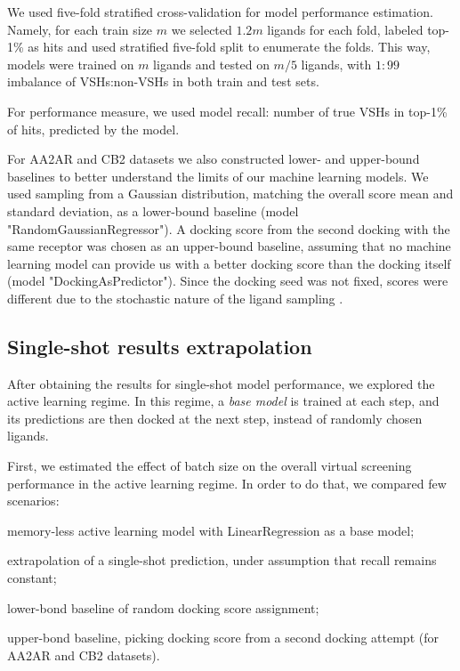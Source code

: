 We used five-fold stratified cross-validation for model performance estimation. Namely, for each train size $m$ we selected $1.2m$ ligands for each fold, labeled top-1\% as hits and used stratified five-fold split to enumerate the folds. This way, models were trained on $m$ ligands and tested on $m/5$ ligands, with $1:99$ imbalance of VSHs:non-VSHs in both train and test sets.

For performance measure, we used model recall: number of true VSHs in top-1\% of hits, predicted by the model.

For AA2AR and CB2 datasets we also constructed lower- and upper-bound baselines to better understand the limits of our machine learning models. We used sampling from a Gaussian distribution, matching the overall score mean and standard deviation, as a lower-bound baseline (model "RandomGaussianRegressor"). A docking score from the second docking with the same receptor was chosen as an upper-bound baseline, assuming that no machine learning model can provide us with a better docking score than the docking itself (model "DockingAsPredictor"). Since the docking seed was not fixed, scores were different due to the stochastic nature of the ligand sampling \cite{abagyan_biased_1994}.

\subsection{Single-shot results extrapolation}

After obtaining the results for single-shot model performance, we explored the active learning regime. In this regime, a \textit{base model} is trained at each step, and its predictions are then docked at the next step, instead of randomly chosen ligands. 

First, we estimated the effect of batch size on the overall virtual screening performance in the active learning regime. In order to do that, we compared few scenarios: 
\begin{enumerate*}[label=(\roman*)]
    \item memory-less active learning model with LinearRegression as a base model;
    \item extrapolation of a single-shot prediction, under assumption that recall remains constant;
    \item lower-bond baseline of random docking score assignment;
    \item upper-bond baseline, picking docking score from a second docking attempt (for AA2AR and CB2 datasets).
\end{enumerate*}

